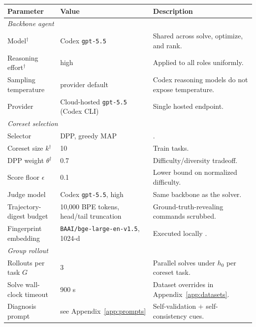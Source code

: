 \documentclass{llmxive}
\begin{document}
\begin{table}[t]
\centering
\small
\begin{tabular}{lll}
\toprule
\textbf{Parameter} & \textbf{Value} & \textbf{Description} \\
\midrule
\multicolumn{3}{l}{\textit{Backbone agent}} \\
\midrule
Model$^{\dagger}$           & Codex \texttt{gpt-5.5}                       & Shared across solve, optimize, and rank. \\
Reasoning effort$^{\dagger}$ & high                                        & Applied to all roles uniformly. \\
Sampling temperature        & provider default                             & Codex reasoning models do not expose temperature. \\
Provider                    & Cloud-hosted \texttt{gpt-5.5} (Codex CLI)    & Single hosted endpoint. \\
\midrule
\multicolumn{3}{l}{\textit{Coreset selection}} \\
\midrule
Selector                    & DPP, greedy MAP                              & \cite{kulesza2012dpp}. \\
Coreset size $k$$^{\dagger}$ & 10                                          & Train tasks. \\
DPP weight $\theta$$^{\dagger}$ & 0.7                                      & Difficulty/diversity tradeoff. \\
Score floor $\epsilon$      & 0.1                                          & Lower bound on normalized difficulty. \\
Judge model                 & Codex \texttt{gpt-5.5}, high                 & Same backbone as the solver. \\
Trajectory-digest budget    & 10{,}000 BPE tokens, head/tail truncation    & Ground-truth-revealing commands scrubbed. \\
Fingerprint embedding       & \texttt{BAAI/bge-large-en-v1.5}, 1024-d      & Executed locally \citep{xiao2023cpack}. \\
\midrule
\multicolumn{3}{l}{\textit{Group rollout}} \\
\midrule
Rollouts per task $G$       & 3                                            & Parallel solves under $h_0$ per coreset task. \\
Solve wall-clock timeout    & 900 s                                        & Dataset overrides in Appendix~\ref{app:datasets}. \\
Diagnosis prompt            & see Appendix~\ref{app:prompts}               & Self-validation $+$ self-consistency cues. \\

\end{tabular}
\end{table}
\end{document}

